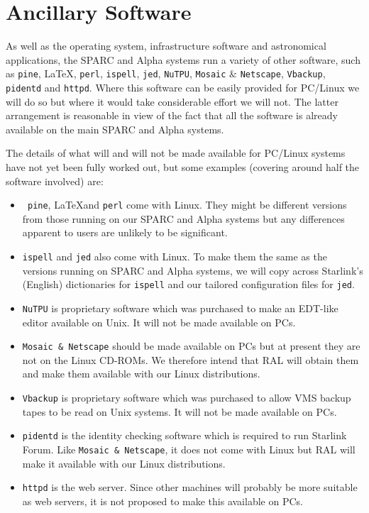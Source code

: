 \documentclass[twoside,11pt]{article}
\newcommand{\htmladdnormallink}[2]{#1}
\begin{document}
\section{Ancillary Software}

As well as the operating system, infrastructure software and
astronomical applications, the SPARC and Alpha systems run a variety of
other software, such as 
\htmladdnormallink{{\tt pine}}{http://www.washington.edu/pine/}, \LaTeX, 
\htmladdnormallink{{\tt perl}}{http://www.perl.com/}, 
\htmladdnormallink{{\tt ispell}}{http://www.gnu.org/software/ispell/ispell.html}, 
\htmladdnormallink{{\tt jed}}{http://www.jedsoft.org/jed/},
\htmladdnormallink{{\tt NuTPU}}{http://www.asoft-dev.com/}, 
{\tt Mosaic} \& {\tt Netscape}, 
\htmladdnormallink{{\tt Vbackup}}{http://www.bosbc.com/brvback.htm}, 
{\tt pidentd} and {\tt httpd}.  
Where this software can be easily provided for PC/Linux
we will do so but where it would take considerable effort we will
not.  The latter arrangement is reasonable in view of the fact that all
the software is already available on the main SPARC and Alpha systems.

The details of what will and will not be made available for PC/Linux
systems have not yet been fully worked out, but some examples (covering
around half the software involved) are:  \begin{itemize} \item {\tt
pine}, \LaTeX and {\tt perl} come with Linux.  They might
      be different versions from those running on our SPARC and Alpha
      systems but any differences apparent to users are unlikely to be
      significant.  \item {\tt ispell} and {\tt jed} also come with 
      Linux.  To make them
      the same as the versions running on SPARC and Alpha systems, 
      we will copy across Starlink's (English) dictionaries for
      {\tt ispell} and our tailored configuration files for {\tt jed}.
\item {\tt NuTPU} is proprietary software which was purchased to
      make an EDT-like editor available on Unix.  It will not be
      made available on PCs.  \item {\tt Mosaic \& Netscape} should
be made available on PCs but at
      present they are not on the Linux CD-ROMs.  We therefore intend
      that RAL will obtain them and make them available with our Linux
      distributions.  \item {\tt Vbackup} is proprietary software which
was purchased to
      allow VMS backup tapes to be read on Unix systems.  It 
      will not be made available on PCs.  \item {\tt pidentd} is the
identity checking software which is required
      to run Starlink Forum.  Like {\tt Mosaic \& Netscape}, it does
      not come with Linux but RAL will make it available with our Linux
      distributions.  \item {\tt httpd} is the web server.  Since other
machines will
      probably be more suitable as web servers, it is not proposed to
      make this available on PCs.  \end{itemize}
\end{document}
